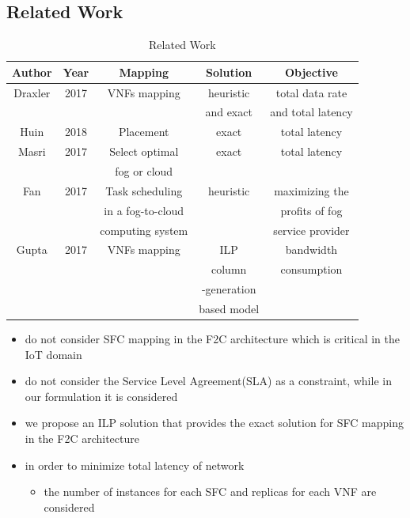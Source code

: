 \documentclass{beamer}
\begin{document}
\subsection{Related Work}
\begin{frame}
	\begin{table}
		\begin{tabular}{|c|c|c|c|c|}
			\toprule
			\textbf{Author} & \textbf{Year} & \textbf{Mapping} &\textbf{Solution}& \textbf{Objective}\\
			\midrule
			Draxler & 2017 & VNFs mapping & heuristic & total data rate \\
			 & & & and exact & and total latency\\
			 \hline
			 Huin &2018 & Placement& exact &total latency\\
             \hline
             Masri&2017& Select optimal  &exact &total latency\\
              & & fog or cloud& & \\
             \hline
             Fan&2017&Task scheduling & heuristic & maximizing the  \\
              & &in a fog-to-cloud & &profits of fog  \\
               & & computing system & & service provider \\
               \hline
               Gupta& 2017& VNFs mapping & ILP  & bandwidth \\
               & & & column&consumption\\
               & & & -generation& \\
               & & &based model &\\
			\bottomrule
		\end{tabular}
		\caption{Related Work}
	\end{table}
	
\end{frame}
\begin{frame}
\begin{itemize}{}	
	\item <1-> { do not
		consider SFC mapping in the F2C architecture which is critical in the IoT domain}
	\item <2-> {do not consider the Service Level Agreement(SLA) as a constraint, while in our formulation it is considered}
	\item <3-> {we propose an ILP solution that provides the
		exact solution for SFC mapping in the F2C architecture}
	\item <4-> {in order to minimize total latency of network}
	\begin{itemize}
		\item <5-> {the
			number of instances for each SFC and replicas for each VNF are
			considered}
	\end{itemize}
\end{itemize}
\end{frame}
\end{document}
